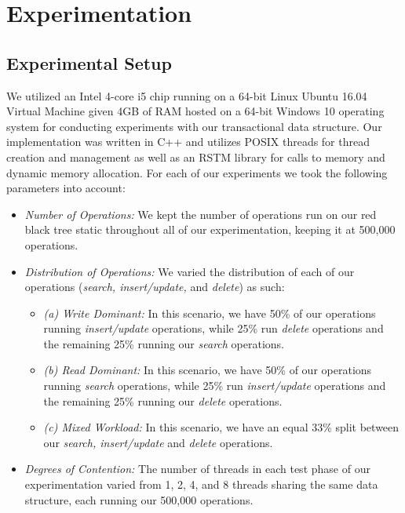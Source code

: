 \documentclass[letterpaper, 10 pt, conference]{ieeeconf}
\begin{document}
\section{Experimentation}
\subsection{Experimental Setup}
We utilized an Intel 4-core i5 chip running on a 64-bit Linux Ubuntu 16.04 Virtual Machine given 4GB of RAM hosted on a 64-bit Windows 10 operating system for conducting experiments with our transactional data structure. Our implementation was written in C++ and utilizes POSIX threads for thread creation and management as well as an RSTM library for calls to memory and dynamic memory allocation. For each of our experiments we took the following parameters into account:
\begin{itemize}
	\item \textit{Number of Operations:} We kept the number of operations run on our red black tree static throughout all of our experimentation, keeping it at 500,000 operations.
	\item \textit{Distribution of Operations:} We varied the distribution of each of our operations (\textit{search, insert/update,} and \textit{delete}) as such:
	\begin{itemize}
		\item \textit{(a) Write Dominant:} In this scenario, we have 50\% of our operations running \textit{insert/update} operations, while 25\% run \textit{delete} operations and the remaining 25\% running our \textit{search} operations.
		\item \textit{(b) Read Dominant:} In this scenario, we have 50\% of our operations running \textit{search} operations, while 25\% run \textit{insert/update} operations and the remaining 25\% running our \textit{delete} operations.
		\item \textit{(c) Mixed Workload:} In this scenario, we have an equal 33\% split between our \textit{search, insert/update} and \textit{delete} operations.
	\end{itemize}
	\item \textit{Degrees of Contention:} The number of threads in each test phase of our experimentation varied from 1, 2, 4, and 8 threads sharing the same data structure, each running our 500,000 operations.
\end{itemize}
\end{document}
